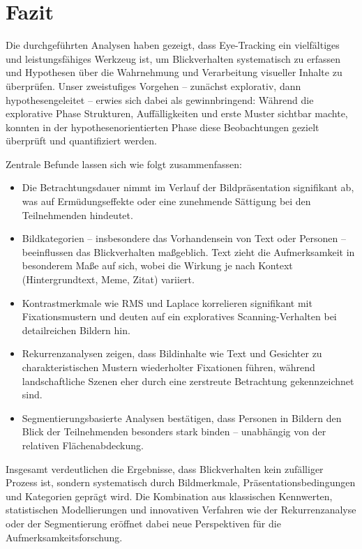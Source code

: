 \documentclass[
    language=german, %
    thesis=seminar, %
    supervisor=postdoc, %
    multiauthor=true, %
    ]{settings/csssa-thesis}
\begin{document}
\section{Fazit}

Die durchgeführten Analysen haben gezeigt, dass Eye-Tracking ein vielfältiges und leistungsfähiges Werkzeug ist, 
um Blickverhalten systematisch zu erfassen und Hypothesen über die Wahrnehmung und Verarbeitung visueller Inhalte 
zu überprüfen. Unser zweistufiges Vorgehen – zunächst explorativ, dann hypothesengeleitet – erwies sich dabei als 
gewinnbringend: Während die explorative Phase Strukturen, Auffälligkeiten und erste Muster sichtbar machte, 
konnten in der hypothesenorientierten Phase diese Beobachtungen gezielt überprüft und quantifiziert werden. 

Zentrale Befunde lassen sich wie folgt zusammenfassen: 
\begin{itemize}
    \item Die Betrachtungsdauer nimmt im Verlauf der Bildpräsentation signifikant ab, 
    was auf Ermüdungseffekte oder eine zunehmende Sättigung bei den Teilnehmenden hindeutet. 
    \item Bildkategorien – insbesondere das Vorhandensein von Text oder Personen – 
    beeinflussen das Blickverhalten maßgeblich. Text zieht die Aufmerksamkeit in besonderem Maße auf sich, 
    wobei die Wirkung je nach Kontext (Hintergrundtext, Meme, Zitat) variiert. 
    \item Kontrastmerkmale wie RMS und Laplace korrelieren signifikant mit Fixationsmustern 
    und deuten auf ein exploratives Scanning-Verhalten bei detailreichen Bildern hin. 
    \item Rekurrenzanalysen zeigen, dass Bildinhalte wie Text und Gesichter zu charakteristischen 
    Mustern wiederholter Fixationen führen, während landschaftliche Szenen eher durch eine zerstreute 
    Betrachtung gekennzeichnet sind. 
    \item Segmentierungsbasierte Analysen bestätigen, dass Personen in Bildern 
    den Blick der Teilnehmenden besonders stark binden – unabhängig von der relativen Flächenabdeckung. 
\end{itemize}

Insgesamt verdeutlichen die Ergebnisse, dass Blickverhalten kein zufälliger Prozess ist, 
sondern systematisch durch Bildmerkmale, Präsentationsbedingungen und Kategorien geprägt wird. 
Die Kombination aus klassischen Kennwerten, statistischen Modellierungen und innovativen Verfahren 
wie der Rekurrenzanalyse oder der Segmentierung eröffnet dabei neue Perspektiven für die 
Aufmerksamkeitsforschung. 
\end{document}
